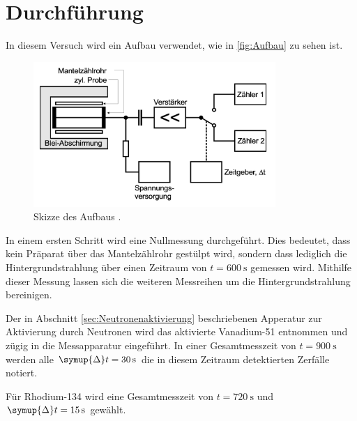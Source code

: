 \section{Durchführung}
\label{sec:Durchführung}
In diesem Versuch wird ein Aufbau verwendet, wie in \autoref{fig:Aufbau} zu sehen ist.
\begin{figure}[H]
    \centering
    \includegraphics[height=5.5cm]{content/pics/Aufbau.png}
    \caption{Skizze des Aufbaus \cite{v702}.}
    \label{fig:Aufbau}
\end{figure}

In einem ersten Schritt wird eine Nullmessung durchgeführt. Dies bedeutet, dass kein Präparat über das Mantelzählrohr 
gestülpt wird, sondern dass lediglich die Hintergrundstrahlung über einen Zeitraum von $t=\qty{600}{\second}$ gemessen wird.
Mithilfe dieser Messung lassen sich die weiteren Messreihen um die Hintergrundstrahlung bereinigen.

Der in Abschnitt \ref{sec:Neutronenaktivierung} beschriebenen Apperatur zur Aktivierung durch Neutronen wird das aktivierte Vanadium-51
entnommen und zügig in die Messapparatur eingeführt. In einer Gesamtmesszeit von $t=\qty{900}{\second}$ werden alle $\symup{\Delta}t=\qty{30}{\second}$
die in diesem Zeitraum detektierten Zerfälle notiert.

Für Rhodium-134 wird eine Gesamtmesszeit von $t=\qty{720}{\second}$ und $\symup{\Delta}t=\qty{15}{\second}$ gewählt.
